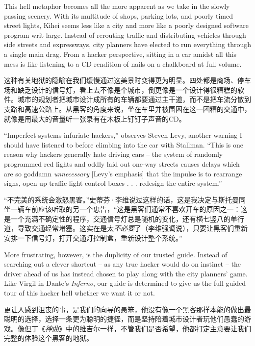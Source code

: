 \ifdefined\eng
This hell metaphor becomes all the more apparent as we take in the slowly passing scenery. With its multitude of shops, parking lots, and poorly timed street lights, Kihei seems less like a city and more like a poorly designed software program writ large. Instead of rerouting traffic and distributing vehicles through side streets and expressways, city planners have elected to run everything through a single main drag. From a hacker perspective, sitting in a car amidst all this mess is like listening to a CD rendition of nails on a chalkboard at full volume.
\fi

\ifdefined\chs
这种有关地狱的隐喻在我们缓慢通过这美景时变得更为明显。四处都是商场、停车场和缺乏设计的信号灯，看上去不像是个城市，倒更像是一个设计得很糟糕的软件。城市的规划者把城市设计成所有的车辆都要通过主干道，而不是把车流分散到支路和高速公路上。从黑客的角度来说，坐在车里并被围困在这一团糟的交通中，就像是用最大的音量听一张录有在木板上钉钉子声音的CD。
\fi

\ifdefined\eng
``Imperfect systems infuriate hackers,'' observes Steven Levy, another warning I should have listened to before climbing into the car with Stallman. ``This is one reason why hackers generally hate driving cars -- the system of randomly programmed red lights and oddly laid out one-way streets causes delays which are so goddamn \textit{unnecessary} [Levy's emphasis] that the impulse is to rearrange signs, open up traffic-light control boxes . . . redesign the entire system.''
\fi

\ifdefined\chs
``不完美的系统会激怒黑客。''史蒂芬·李维说过这样的话，这是我决定与斯托曼同坐一辆车前应该听取的另一个忠告，``这是黑客们通常不喜欢开车的原因之一：这是一个充满不确定性的程序，交通信号灯总是随机的变化，还有横七竖八的单行道，导致交通经常堵塞。这实在是太\textit{不必要}了（李维强调说），只要让黑客们重新安排一下信号灯，打开交通灯控制盒，重新设计整个系统。'' 
\fi

\ifdefined\eng
More frustrating, however, is the duplicity of our trusted guide. Instead of searching out a clever shortcut -- as any true hacker would do on instinct -- the driver ahead of us has instead chosen to play along with the city planners' game. Like Virgil in Dante's \textit{Inferno}, our guide is determined to give us the full guided tour of this hacker hell whether we want it or not.
\fi

\ifdefined\chs
更让人感到沮丧的事，是我们的向导的愚笨，他没有像一个黑客那样本能的做出最聪明的选择，选择一条更为聪明的捷径，而是坚持陪着城市设计者玩他们愚蠢的游戏。像但丁《\textit{神曲}》中的维吉尔一样，不管我们是否希望，他都打定主意要让我们完整的体验这个黑客的地狱。
\fi

